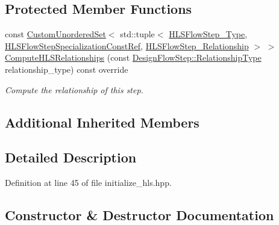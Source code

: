 \subsection*{Protected Member Functions}
\begin{DoxyCompactItemize}
\item 
const \hyperlink{classCustomUnorderedSet}{Custom\+Unordered\+Set}$<$ std\+::tuple$<$ \hyperlink{hls__step_8hpp_ada16bc22905016180e26fc7e39537f8d}{H\+L\+S\+Flow\+Step\+\_\+\+Type}, \hyperlink{hls__step_8hpp_a5fdd2edf290c196531d21d68e13f0e74}{H\+L\+S\+Flow\+Step\+Specialization\+Const\+Ref}, \hyperlink{hls__step_8hpp_a3ad360b9b11e6bf0683d5562a0ceb169}{H\+L\+S\+Flow\+Step\+\_\+\+Relationship} $>$ $>$ \hyperlink{classInitializeHLS_a2804a23ba47f9c42d9474cec67d6a673}{Compute\+H\+L\+S\+Relationships} (const \hyperlink{classDesignFlowStep_a723a3baf19ff2ceb77bc13e099d0b1b7}{Design\+Flow\+Step\+::\+Relationship\+Type} relationship\+\_\+type) const override
\begin{DoxyCompactList}\small\item\em Compute the relationship of this step. \end{DoxyCompactList}\end{DoxyCompactItemize}
\subsection*{Additional Inherited Members}


\subsection{Detailed Description}


Definition at line 45 of file initialize\+\_\+hls.\+hpp.



\subsection{Constructor \& Destructor Documentation}
\mbox{\label{classInitializeHLS_acd3588fecbb6f0b78e6d21be966d856d}} 
